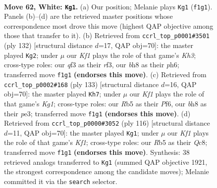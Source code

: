 \documentclass[11pt]{article}
\begin{document}
\clearpage

\begin{figure}[p]\centering
\begin{subfigure}{0.46\textwidth}\centering
\resizebox{\linewidth}{!}{%
\newchessgame
\chessboard[
  setfen={5k1b/5p2/8/1R1P4/8/5q2/8/5K2 w - - 1 62},
  showmover=false,
  pgfstyle=straightmove, color=movearrow, markmove={f1-g1}
]}
\caption{}
\end{subfigure}\hfill
\begin{subfigure}{0.46\textwidth}\centering
\resizebox{\linewidth}{!}{%
\newchessgame
\chessboard[
  setfen={R7/8/5k1p/5p2/P7/5r1K/8/8 w - - 3 67},
  showmover=false,
  pgfstyle=straightmove, color=movearrow, markmove={h3-g2}
]}
\caption{}
\end{subfigure}
\\[4pt]
\begin{subfigure}{0.46\textwidth}\centering
\resizebox{\linewidth}{!}{%
\newchessgame
\chessboard[
  setfen={4Q1k1/8/5p2/4p2P/7K/4P3/8/5q2 b - - 14 67},
  showmover=false,
  pgfstyle=straightmove, color=movearrow, markmove={g8-h7}
]}
\caption{}
\end{subfigure}\hfill
\begin{subfigure}{0.46\textwidth}\centering
\resizebox{\linewidth}{!}{%
\newchessgame
\chessboard[
  setfen={2Q5/6k1/5p2/8/8/5qP1/8/5K2 w - - 11 59},
  showmover=false,
  pgfstyle=straightmove, color=movearrow, markmove={f1-g1}
]}
\caption{}
\end{subfigure}
\caption{\textbf{Move 62, White: \texttt{Kg1}.} (a) Our position; Melanie plays \texttt{Kg1} (\texttt{f1g1}). Panels (b)--(d) are the retrieved master positions whose correspondence most drove this move (highest QAP objective among those that transfer to it). (b) Retrieved from \texttt{ccrl\_top\_p0001\#3501} (ply 132) [structural distance $d$=17, QAP obj=70]: the master played \texttt{Kg2}; under $\mu$ our \emph{Kf1} plays the role of that game's \emph{Kh3}; cross-type roles: our \emph{q}f3 as their \emph{r}f3, our \emph{b}h8 as their \emph{p}h6; transferred move \texttt{f1g1} \textbf{(endorses this move)}. (c) Retrieved from \texttt{ccrl\_top\_p0002\#168} (ply 133) [structural distance $d$=16, QAP obj=70]: the master played \texttt{Kh7}; under $\mu$ our \emph{Kf1} plays the role of that game's \emph{Kg1}; cross-type roles: our \emph{R}b5 as their \emph{P}f6, our \emph{b}h8 as their \emph{p}e3; transferred move \texttt{f1g1} \textbf{(endorses this move)}. (d) Retrieved from \texttt{ccrl\_top\_p0000\#3052} (ply 116) [structural distance $d$=11, QAP obj=70]: the master played \texttt{Kg1}; under $\mu$ our \emph{Kf1} plays the role of that game's \emph{Kf1}; cross-type roles: our \emph{R}b5 as their \emph{Q}c8; transferred move \texttt{f1g1} \textbf{(endorses this move)}. Synthesis: 38 retrieved analogs transferred to \texttt{Kg1} (summed QAP objective 1921, the strongest correspondence among the candidate moves); Melanie committed it via the \texttt{search} selector.}
\label{fig:thought-m122}
\end{figure}
\end{document}
